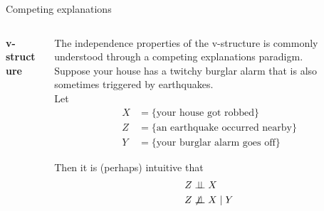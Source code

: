 \documentclass[10pt]{beamer}
\begin{document}
 \begin{frame}{Competing explanations}




\begin{columns}[onlytextwidth,t]
 \begin{column}{0.3\textwidth}
  \centering
    \textbf{v-structure} \\[.3cm]
		   \\[.3cm]
    \end{column}
    
 \begin{column}{0.6\textwidth}
 \scriptsize
The independence properties of the v-structure is commonly understood through a \alert{competing explanations} paradigm. \\[.3cm]
Suppose your house has a twitchy burglar alarm that is also sometimes triggered by earthquakes.    \\[.3cm]

Let 
\begin{align*}
 X &= \{ \text{your house got robbed} \} \\
 Z &= \{ \text{an earthquake occurred nearby} \} \\
  Y &= \{ \text{your burglar alarm goes off} \}  
 \end{align*}
 
 Then it is \tiny (perhaps) \scriptsize intuitive that
 \begin{align*}
   Z & \perp \!\!\! \perp X  \\
   Z & \not\perp \!\!\! \perp X \; | \; Y
 \end{align*}
 
  \end{column}
    
\end{columns}
\end{frame}
\end{document}
